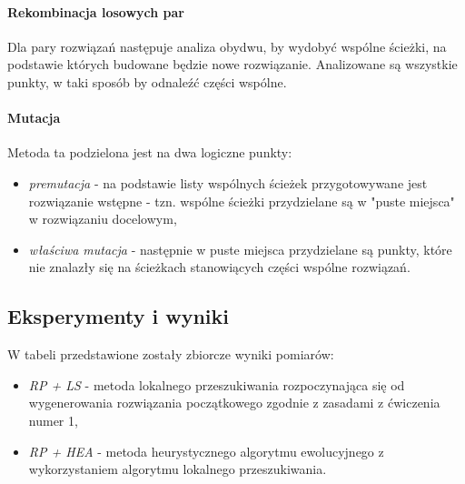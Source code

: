 \documentclass{article}
\begin{document}
\paragraph{Rekombinacja losowych par}
Dla pary rozwiązań następuje analiza obydwu, by wydobyć wspólne ścieżki, na podstawie których budowane będzie nowe rozwiązanie. Analizowane są wszystkie punkty, w taki sposób by odnaleźć części wspólne.

\paragraph{Mutacja}
Metoda ta podzielona jest na dwa logiczne punkty:
\begin{itemize}
		\item \emph{premutacja} - na podstawie listy wspólnych ścieżek przygotowywane jest rozwiązanie wstępne - tzn. wspólne ścieżki przydzielane są w "puste miejsca" w rozwiązaniu docelowym,
		\item \emph{właściwa mutacja} - następnie w puste miejsca przydzielane są punkty, które nie znalazły się na ścieżkach stanowiących części wspólne rozwiązań.
\end{itemize}

\subsection{Eksperymenty i wyniki}
W tabeli przedstawione zostały zbiorcze wyniki pomiarów:
\begin{itemize}
	\item \emph{RP + LS} - metoda lokalnego przeszukiwania rozpoczynająca się od wygenerowania rozwiązania początkowego zgodnie z zasadami z ćwiczenia numer 1,
	\item \emph{RP + HEA} - metoda heurystycznego algorytmu ewolucyjnego z wykorzystaniem algorytmu lokalnego przeszukiwania. 
\end{itemize}
	
\end{document}

